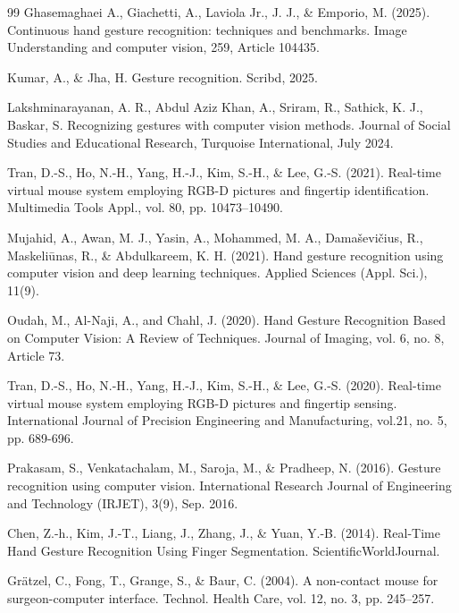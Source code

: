 \documentclass[conference]{IEEEtran}
\begin{document}
\begin{thebibliography}{99}
 Ghasemaghaei A., Giachetti, A., Laviola Jr., J. J., \& Emporio, M. (2025). Continuous hand gesture recognition: techniques and benchmarks. Image Understanding and computer vision, 259, Article 104435.

 Kumar, A., \& Jha, H. Gesture recognition. Scribd, 2025.

 Lakshminarayanan, A. R., Abdul Aziz Khan, A., Sriram, R., Sathick, K. J., Baskar, S. Recognizing gestures with computer vision methods. Journal of Social Studies and Educational Research, Turquoise International, July 2024.

 Tran, D.-S., Ho, N.-H., Yang, H.-J., Kim, S.-H., \& Lee, G.-S. (2021). Real-time virtual mouse system employing RGB-D pictures and fingertip identification. Multimedia Tools Appl., vol. 80, pp. 10473--10490.

 Mujahid, A., Awan, M. J., Yasin, A., Mohammed, M. A., Damaševičius, R., Maskeliūnas, R., \& Abdulkareem, K. H. (2021). Hand gesture recognition using computer vision and deep learning techniques. Applied Sciences (Appl. Sci.), 11(9).

 Oudah, M., Al-Naji, A., and Chahl, J. (2020). Hand Gesture Recognition Based on Computer Vision: A Review of Techniques. Journal of Imaging, vol. 6, no. 8, Article 73.

 Tran, D.-S., Ho, N.-H., Yang, H.-J., Kim, S.-H., \& Lee, G.-S. (2020). Real-time virtual mouse system employing RGB-D pictures and fingertip sensing. International Journal of Precision Engineering and Manufacturing, vol.21, no. 5, pp. 689-696.

 Prakasam, S., Venkatachalam, M., Saroja, M., \& Pradheep, N. (2016). Gesture recognition using computer vision. International Research Journal of Engineering and Technology (IRJET), 3(9), Sep. 2016.

 Chen, Z.-h., Kim, J.-T., Liang, J., Zhang, J., \& Yuan, Y.-B. (2014). Real-Time Hand Gesture Recognition Using Finger Segmentation. ScientificWorldJournal.

 Grätzel, C., Fong, T., Grange, S., \& Baur, C. (2004). A non-contact mouse for surgeon-computer interface. Technol. Health Care, vol. 12, no. 3, pp. 245--257.

\end{thebibliography}
\end{document}
